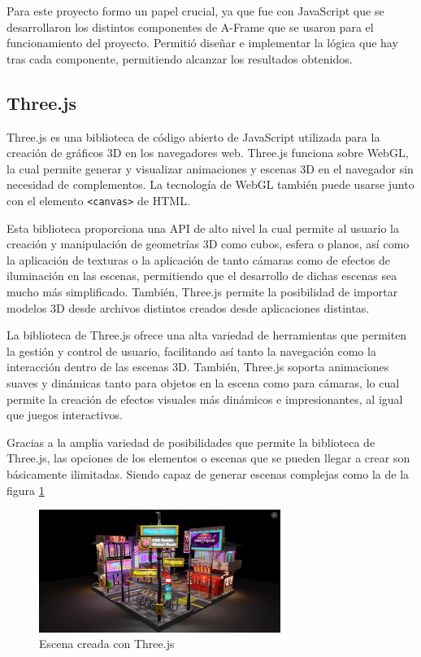 \documentclass[a4paper, 12pt]{book}
\begin{document}
Para este proyecto formo un papel crucial, ya que fue con JavaScript que se desarrollaron los distintos componentes de A-Frame que se usaron para el funcionamiento del proyecto. Permitió diseñar e implementar la lógica que hay tras cada componente, permitiendo alcanzar los resultados obtenidos.

\subsection{Three.js}
\label{subsec:Threejs}

Three.js \cite{dirksen2015} es una biblioteca de código abierto de JavaScript utilizada para la creación de gráficos 3D en los navegadores web. Three.js funciona sobre WebGL, la cual permite generar y visualizar animaciones y escenas 3D en el navegador sin necesidad de complementos. La tecnología de WebGL también puede usarse junto con el elemento \texttt{<canvas>} de HTML.

Esta biblioteca proporciona una API de alto nivel la cual permite al usuario la creación y manipulación de geometrías 3D como cubos, esfera o planos, así como la aplicación de texturas o la aplicación de tanto cámaras como de efectos de iluminación en las escenas, permitiendo que el desarrollo de dichas escenas sea mucho más simplificado. 
También, Three.js permite la posibilidad de importar modelos 3D desde archivos distintos creados desde aplicaciones distintas.

La biblioteca de Three.js ofrece una alta variedad de herramientas que permiten la gestión y control de usuario, facilitando así tanto la navegación como la interacción dentro de las escenas 3D. También, Three.js soporta animaciones suaves y dinámicas tanto para objetos en la escena como para cámaras, lo cual permite la creación de efectos visuales más dinámicos e impresionantes, al igual que juegos interactivos. 

Gracias a la amplia variedad de posibilidades que permite la biblioteca de Three.js, las opciones de los elementos o escenas que se pueden llegar a crear son básicamente ilimitadas. Siendo capaz de generar escenas complejas como la de la figura \ref{fig:three}
\begin{figure}[H] 
  \centering
  \includegraphics[width=0.7\textwidth]{img/three.jpeg}
  \caption{Escena creada con Three.js}
  \label{fig:three}
\end{figure}
\end{document}
